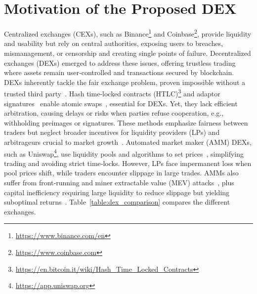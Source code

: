 \documentclass[runningheads]{llncs}
\begin{document}
\section{Motivation of the Proposed DEX}

Centralized exchanges (CEXs), such as Binance\footnote{\url{https://www.binance.com/en}} and Coinbase\footnote{\url{https://www.coinbase.com}}, provide liquidity and usability but rely on central authorities, exposing users to breaches, mismanagement, or censorship and creating single points of failure. Decentralized exchanges (DEXs) emerged to address these issues, offering trustless trading where assets remain user‑controlled and transactions secured by blockchain. DEXs inherently tackle the fair exchange problem, proven impossible without a trusted third party~\cite{Pagnia1999FE}.
Hash time‑locked contracts (HTLC)\footnote{\url{https://en.bitcoin.it/wiki/Hash_Time_Locked_Contracts}} and adaptor signatures~\cite{Erwig2021Adaptor,Aumayr2021Adaptor} enable atomic swaps~\cite{Thyagarajan2022Swap,Zhang2024OFE}, essential for DEXs. Yet, they lack efficient arbitration, causing delays or risks when parties refuse cooperation, e.g., withholding preimages or signatures. These methods emphasize fairness between traders but neglect broader incentives for liquidity providers (LPs) and arbitrageurs crucial to market growth~\cite{Augusto2024Interoperability}.
Automated market maker (AMM) DEXs, such as Uniswap\footnote{\url{https://app.uniswap.org}}, use liquidity pools and algorithms to set prices~\cite{Xu2023AMM}, simplifying trading and avoiding strict time‑locks. However, LPs face impermanent loss when pool prices shift, while traders encounter slippage in large trades. AMMs also suffer from front‑running and miner extractable value (MEV) attacks~\cite{Daian2020DEX,Baum2021DEX}, plus capital inefficiency requiring large liquidity to reduce slippage but yielding suboptimal returns~\cite{Heimbach2022Uniswap}.
Table~\ref{table:dex_comparison} compares the different exchanges.
\end{document}
